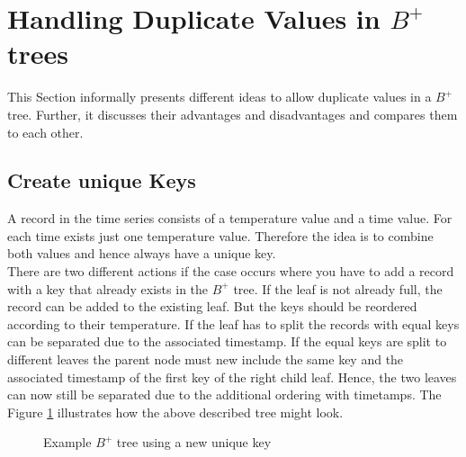 \documentclass[abstracton,12pt]{scrreprt}
\begin{document}
\section{Handling Duplicate Values in $B^+$ trees}
\label{allowDV}
This Section informally presents different ideas to allow duplicate values in a $B^+$ tree. Further, it discusses their advantages and disadvantages and compares them to each other. 

\subsection{Create unique Keys}
A record in the time series consists of a temperature value and a time value. For each time exists just one temperature value. Therefore the idea is to combine both values and hence always have a unique key. \\
There are two different actions if the case occurs where you have to add a record with a key that already exists in the $B^+$ tree. If the leaf is not already full, the record can be added to the existing leaf. But the keys should be reordered according to their temperature. If the leaf has to split the records with equal keys can be separated due to the associated timestamp. If the equal keys are split to different leaves the parent node must new include the same key and the associated timestamp of the first key of the right child leaf. Hence, the two leaves can now still be separated due to the additional ordering with timetamps. The Figure \ref{fig:keyT} illustrates how the above described tree might look. 
\begin{figure}[H]
	\centering
	\vspace{2mm}
	\caption{Example $B^+$ tree using a new unique key}
	\label{fig:keyT}
	
\end{figure}		
\end{document}
